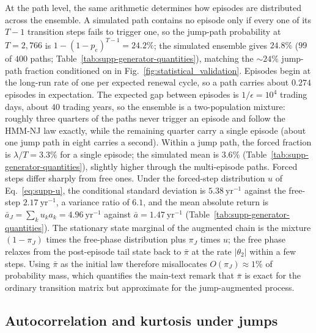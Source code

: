 At the path level, the same arithmetic determines how episodes are
distributed across the ensemble. A simulated path contains no episode
only if every one of its $T - 1$ transition steps fails to trigger
one, so the jump-path probability at $T = 2{,}766$ is
$1 - (1 - p_e)^{T-1} = 24.2\%$; the simulated ensemble
gives $24.8\%$ ($99$ of $400$ paths;
Table~\ref{tab:supp-generator-quantities}), matching the $\sim\!24\%$
jump-path fraction conditioned on in
Fig.~\ref{fig:statistical_validation}. Episodes begin
at the long-run rate of one per expected renewal cycle, so a path
carries about $0.274$ episodes in expectation. The expected gap
between episodes is $1/\epsilon = 10^4$ trading days, about $40$
trading years, so the ensemble is a two-population mixture: roughly
three quarters of the paths never trigger an episode and follow the
HMM-NJ law exactly, while the remaining quarter carry a single
episode (about one jump path in eight carries a second). Within a
jump path, the forced fraction is $\lambda / T = 3.3\%$ for a single
episode; the simulated mean is $3.6\%$
(Table~\ref{tab:supp-generator-quantities}), slightly higher through the
multi-episode paths. Forced steps differ sharply from free ones. Under
the forced-step distribution $u$ of Eq.~\eqref{eq:supp-u}, the
conditional standard deviation is $5.38~\mathrm{yr}^{-1}$ against the
free-step $2.17~\mathrm{yr}^{-1}$, a variance ratio of $6.1$, and the
mean absolute return is $\bar a_J = \sum_k u_k a_k =
4.96~\mathrm{yr}^{-1}$ against $\bar a = 1.47~\mathrm{yr}^{-1}$
(Table~\ref{tab:supp-generator-quantities}). The
stationary state marginal of the augmented chain is the mixture
$(1 - \pi_J)$ times the free-phase distribution plus $\pi_J$ times
$u$; the free phase relaxes from the post-episode tail state back to
$\bar\pi$ at the rate $|\theta_2|$ within a few steps. Using
$\bar\pi$ as the initial law therefore misallocates $O(\pi_J) \approx
1\%$ of probability mass, which quantifies the main-text remark that
$\bar\pi$ is exact for the ordinary transition matrix but approximate
for the jump-augmented process.

\subsection{Autocorrelation and kurtosis under jumps}
\label{sec:supp-gen-tuning}

